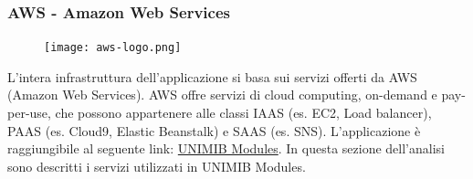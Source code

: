 \documentclass[12pt]{article}
\begin{document}
			\subsubsection{AWS - Amazon Web Services}
			\begin{figure}[H]
				\texttt{[image: aws-logo.png]}
			\end{figure}
			L'intera infrastruttura dell'applicazione si basa sui servizi offerti da AWS (Amazon Web Services). AWS offre servizi di cloud computing, on-demand e pay-per-use, che possono appartenere alle classi IAAS (es. EC2, Load balancer), PAAS (es. Cloud9, Elastic Beanstalk) e SAAS (es. SNS). L'applicazione è raggiungibile al seguente link: \textcolor{blue}{\href{http://unimibquestionari-env.eba-3behr9mi.eu-central-1.elasticbeanstalk.com/}{UNIMIB Modules}}. In questa sezione dell'analisi sono descritti i servizi utilizzati in UNIMIB Modules. 
\end{document}
